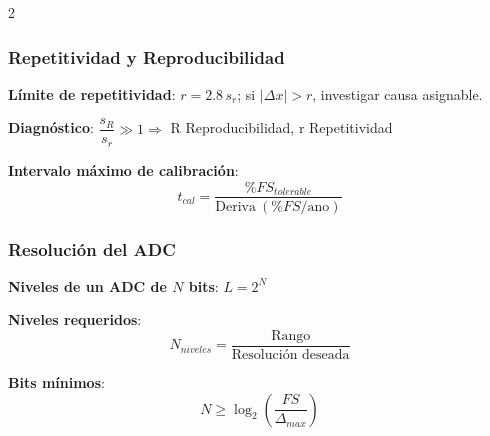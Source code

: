 \documentclass{article}
\begin{document}
\begin{multicols}{2}
\subsubsection*{Repetitividad y Reproducibilidad}
\begin{itemform}
\item \textbf{Límite de repetitividad}: $r=2.8\,s_r$; si $|\Delta x|>r$, investigar causa asignable.
\item \textbf{Diagnóstico}: $\dfrac{s_R}{s_r}\gg1 \Rightarrow$ R Reproducibilidad, r Repetitividad
\end{itemform}


\begin{itemform}
\item \textbf{Intervalo máximo de calibración}:
$$t_{cal}=\frac{\%FS_{tolerable}}{\text{Deriva}\ (\%FS/\text{ano})}$$
\end{itemform}



\subsubsection*{Resolución del ADC}
\begin{itemform}
\item \textbf{Niveles de un ADC de $N$ bits}: $L=2^N$
\item \textbf{Niveles requeridos}:
$$N_{niveles}=\frac{\text{Rango}}{\text{Resolución deseada}}$$
\item \textbf{Bits mínimos}:
$$
N \ge \log_2\left(\frac{FS}{\Delta_{max}}\right)
$$

\end{itemform}

\end{multicols}
\end{document}

